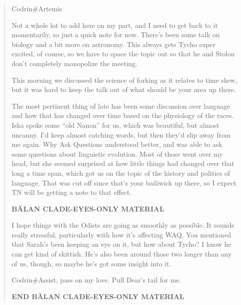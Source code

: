 \begin{quote}
Codrin\#Artemis

Not a whole lot to add here on my part, and I need to get back to it momentarily, so just a quick note for now. There's been some talk on biology and a bit more on astronomy. This always gets Tycho super excited, of course, so we have to space the topic out so that he and Stolon don't completely monopolize the meeting.

This morning we discussed the science of forking as it relates to time skew, but it was hard to keep the talk out of what should be your area up there.

The most pertinent thing of late has been some discussion over language and how that has changed over time based on the physiology of the races. Iska spoke some ``old Nanon'' for us, which was beautiful, but almost uncanny. I'd keep almost catching words, but then they'd slip away from me again. Why Ask Questions understood better, and was able to ask some questions about linguistic evolution. Most of those went over my head, but she seemed surprised at how little things had changed over that long a time span, which got us on the topic of the history and politics of language. That was cut off since that's your bailiwick up there, so I expect TN will be getting a note to that effect.

\textbf{BĂLAN CLADE-EYES-ONLY MATERIAL}

I hope things with the Odists are going as smoothly as possible. It sounds really stressful, particularly with how it's affecting WAQ. You mentioned that Sarah's been keeping an eye on it, but how about Tycho? I know he can get kind of skittish. He's also been around those two longer than any of us, though, so maybe he's got some insight into it.

Codrin\#Assist, pass on my love. Pull Dear's tail for me.

\textbf{END BĂLAN CLADE-EYES-ONLY MATERIAL}
\end{quote}
